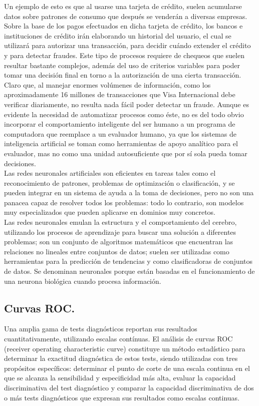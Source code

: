 Un ejemplo de esto es que al usarse una tarjeta de crédito, suelen acumularse datos sobre patrones de consumo que después se venderán a diversas empresas. Sobre la base de los pagos efectuados en dicha tarjeta de crédito, los bancos e instituciones de crédito irán elaborando un historial del usuario, el cual se utilizará para autorizar una transacción, para decidir cuándo extender el crédito y para detectar fraudes. Este tipo de procesos requiere de chequeos que suelen resultar bastante complejos, además del uso de criterios variables para poder tomar una decisión final en torno a la autorización de una cierta transacción. Claro que, al manejar enormes volúmenes de información, como los aproximadamente 16 millones de transacciones que Visa Internacional debe verificar diariamente, no resulta nada fácil poder detectar un fraude. Aunque es evidente la necesidad de automatizar procesos como éste, no es del todo obvio incorporar el comportamiento inteligente del ser humano a un programa de computadora que reemplace a un evaluador humano, ya que los sistemas de inteligencia artificial se toman como herramientas de apoyo analítico para el evaluador, mas no como una unidad autosuficiente que por sí sola pueda tomar decisiones.\\

Las redes neuronales artificiales son eficientes en tareas tales como el reconocimiento de patrones, problemas de optimización o clasificación, y se pueden integrar en un sistema de ayuda a la toma de decisiones, pero no son una panacea capaz de resolver todos los problemas: todo lo contrario, son modelos muy especializados que pueden aplicarse en dominios muy concretos.\\

Las redes neuronales emulan la estructura y el comportamiento del cerebro, utilizando los procesos de aprendizaje para buscar una solución a diferentes problemas; son un conjunto de algoritmos matemáticos que encuentran las relaciones no lineales entre conjuntos de datos; suelen ser utilizadas como herramientas para la predicción de tendencias y como clasificadoras de conjuntos de datos. Se denominan neuronales porque están basadas en el funcionamiento de una neurona biológica cuando procesa información.

\subsection{Curvas ROC.}

Una amplia gama de tests diagnósticos reportan sus resultados cuantitativamente, utilizando escalas contínuas. El análisis de curvas ROC (receiver operating characteristic curve) constituye un método estadístico para determinar la exactitud diagnóstica de estos tests, siendo utilizadas con tres propósitos específicos: determinar el punto de corte de una escala continua en el que se alcanza la sensibilidad y especificidad más alta, evaluar la capacidad discriminativa del test diagnóstico y comparar la capacidad discriminativa de dos o más tests diagnósticos que expresan sus resultados como escalas continuas.

